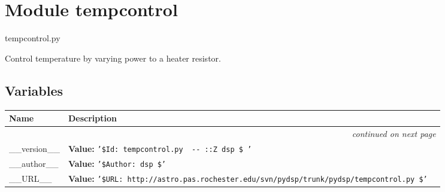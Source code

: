 %
%
%


\section{Module tempcontrol}

    \label{tempcontrol}
tempcontrol.py

Control temperature by varying power to a heater resistor.



  \subsection{Variables}

\begin{longtable}{|p{}|p{}|l}
\cline{1-2}
\cline{1-2} \centering \textbf{Name} & \centering \textbf{Description}& \\
\cline{1-2}
\endhead\cline{1-2}\multicolumn{3}{r}{\small\textit{continued on next page}}\\\endfoot\cline{1-2}
\endlastfoot\raggedright \_\-\_\-v\-e\-r\-s\-i\-o\-n\-\_\-\_\- & \textbf{Value:} 
{\tt '\-\$\-I\-d\-:\-~\-t\-e\-m\-p\-c\-o\-n\-t\-r\-o\-l\-.\-p\-y\-~\-3\-1\-4\-~\-2\-0\-0\-4\--\-1\-2\--\-0\-7\-~\-1\-5\-:\-2\-5\-:\-5\-1\-Z\-~\-d\-s\-p\-~\-\$\-~\-'\-}&\\
\cline{1-2}
\raggedright \_\-\_\-a\-u\-t\-h\-o\-r\-\_\-\_\- & \textbf{Value:} 
{\tt '\-\$\-A\-u\-t\-h\-o\-r\-:\-~\-d\-s\-p\-~\-\$\-'\-}&\\
\cline{1-2}
\raggedright \_\-\_\-U\-R\-L\-\_\-\_\- & \textbf{Value:} 
{\tt '\-\$\-U\-R\-L\-:\-~\-h\-t\-t\-p\-:\-/\-/\-a\-s\-t\-r\-o\-.\-p\-a\-s\-.\-r\-o\-c\-h\-e\-s\-t\-e\-r\-.\-e\-d\-u\-/\-s\-v\-n\-/\-p\-y\-d\-s\-p\-/\-t\-r\-u\-n\-k\-/\-p\-y\-d\-s\-p\-/\-t\-e\-m\-p\-c\-o\-n\-t\-r\-o\-l\-.\-p\-y\-~\-\$\-'\-}&\\
\cline{1-2}
\end{longtable}


